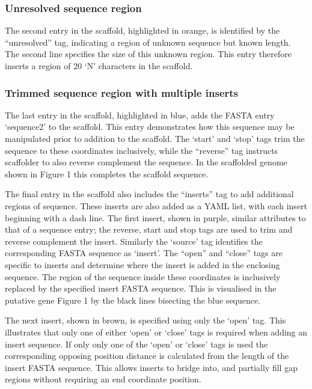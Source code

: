 \documentclass[10pt]{bmc_article}
\newenvironment{bmcformat}{\begin{raggedright}\baselineskip20pt\sloppy\setboolean{publ}{false}}{\end{raggedright}\baselineskip20pt\sloppy}
\begin{document}
\begin{bmcformat}
\subsubsection*{Unresolved sequence region} %

The second entry in the scaffold, highlighted in orange, is identified by the
``unresolved'' tag, indicating a region of unknown sequence but known length.
The second line specifies the size of this unknown region. This entry therefore
inserts a region of 20 `N' characters in the scaffold. \pb

\subsubsection*{Trimmed sequence region with multiple inserts} %

The last entry in the scaffold, highlighted in blue, adds the FASTA entry
`sequence2' to the scaffold. This entry demonstrates how this sequence may be
manipulated prior to addition to the scaffold. The `start' and `stop' tags trim
the sequence to these coordinates inclusively, while the ``reverse'' tag
instructs scaffolder to also reverse complement the sequence. In the scaffolded
genome shown in Figure 1 this completes the scaffold sequence. \pb

The final entry in the scaffold also includes the ``inserts'' tag to add
additional regions of sequence. These inserts are also added as a YAML list,
with each insert beginning with a dash line. The first insert, shown in purple,
similar attributes to that of a sequence entry; the reverse, start and stop
tags are used to trim and reverse complement the insert. Similarly the `source'
tag identifies the corresponding FASTA sequence as `insert'. The ``open'' and
``close'' tags are specific to inserts and determine where the insert is added
in the enclosing sequence. The region of the sequence inside these coordinates
is inclusively replaced by the specified insert FASTA sequence. This is
visualised in the putative gene Figure 1 by the black lines bisecting the blue
sequence. \pb

The next insert, shown in brown, is specified using only the `open' tag. This
illustrates that only one of either `open' or `close' tags is required when
adding an insert sequence. If only only one of the `open' or `close' tags is
used the corresponding opposing position distance is calculated from the length
of the insert FASTA sequence. This allows inserts to bridge into, and partially
fill gap regions without requiring an end coordinate position. \pb


\end{bmcformat}
\end{document}
